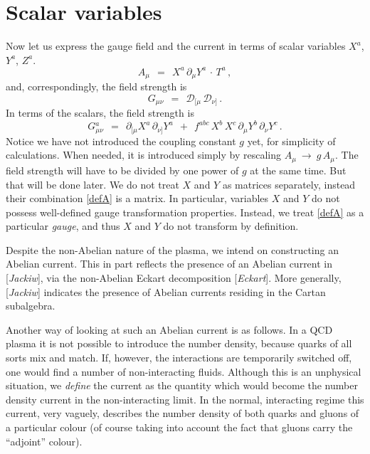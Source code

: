 \documentclass[epsfig,12pt]{article}
\def\beq{\begin{equation}}
\def\eeq{\end{equation}}
\newcommand{\p}{\partial}
\newcommand{\md}{\mathcal{D}}
\begin{document}
\section{Scalar variables}

	Now let us express the gauge field and the current in terms of scalar variables $ X^a $, $ Y^a $, $ Z^a $.
\beq
\label{defA}
        A_\mu    ~~=~~    X^a\, \p_\mu Y^a\, \cdot\, T^a\,,
\eeq
	and, correspondingly, the field strength is
\beq
\label{defG}
	G_{\mu\nu}    ~~=~~    \md_{[\mu}\, \md_{\nu]}\,.
\eeq
	In terms of the scalars, the field strength is
\beq
\label{Ga}
	G{}_{\mu\nu}^a    ~~=~~    \p_{[\mu} X^a\, \p_{\nu]} Y^a  ~~+~~
				   f^{abc}\, X^b\, X^c\, \p_\mu Y^b\, \p_\nu Y^c\,.
\eeq
        Notice we have not introduced the coupling constant $ g $ yet, for simplicity of calculations.
	When needed, it is introduced simply by rescaling $ A_\mu ~\to~ g\, A_\mu $.
	The field strength will have to be divided by one power of $ g $ at the same time.
	But that will be done later.
        We do not treat $ X $ and $ Y $ as matrices separately, instead their combination \eqref{defA} is a matrix.
	In particular, variables $ X $ and $ Y $ do not possess well-defined gauge transformation properties.
	Instead, we treat \eqref{defA} as a particular \emph{gauge}, and thus
	$ X $ and $ Y $ do not transform by definition.

	Despite the non-Abelian nature of the plasma, we intend on constructing an Abelian current.
        This in part reflects the presence of an Abelian current in [{\it Jackiw}], via the non-Abelian Eckart decomposition [{\it Eckart}].
	More generally, [{\it Jackiw}] indicates the presence of Abelian currents residing in the Cartan subalgebra.

	Another way of looking at such an Abelian current is as follows.
	In a QCD plasma it is not possible to introduce the number density, because quarks of all sorts
	mix and match.
	If, however, the interactions are temporarily switched off, one would find a number of non-interacting fluids.
	Although this is an unphysical situation, we \emph{define} the current as the quantity which would
        become the number density current in the non-interacting limit.
	In the normal, interacting regime this current, very vaguely, describes the number density
	of both quarks and gluons of a particular colour
	(of course taking into account the fact that gluons carry the ``adjoint'' colour).
\end{document}
